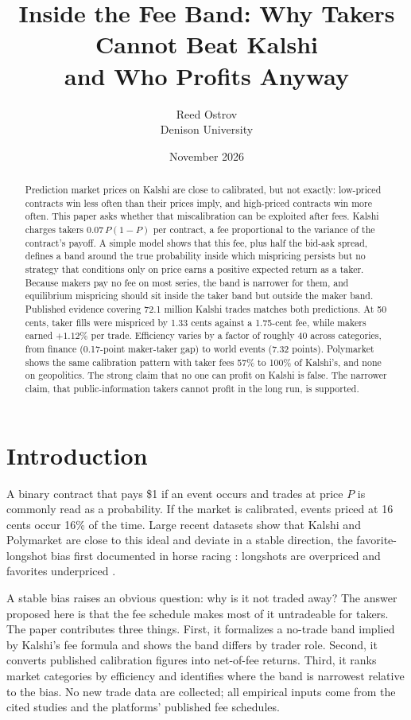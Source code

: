 \documentclass[11pt]{article}
\title{\textbf{Inside the Fee Band: Why Takers Cannot Beat Kalshi\\and Who Profits Anyway}}
\author{Reed Ostrov\\ \small Denison University}
\date{\small November 2026}
\begin{document}
\maketitle

\begin{abstract}
\noindent
Prediction market prices on Kalshi are close to calibrated, but not exactly: low-priced contracts win less often than their prices imply, and high-priced contracts win more often. This paper asks whether that miscalibration can be exploited after fees. Kalshi charges takers $0.07\,P(1-P)$ per contract, a fee proportional to the variance of the contract's payoff. A simple model shows that this fee, plus half the bid-ask spread, defines a band around the true probability inside which mispricing persists but no strategy that conditions only on price earns a positive expected return as a taker. Because makers pay no fee on most series, the band is narrower for them, and equilibrium mispricing should sit inside the taker band but outside the maker band. Published evidence covering 72.1 million Kalshi trades matches both predictions. At 50 cents, taker fills were mispriced by 1.33 cents against a 1.75-cent fee, while makers earned $+1.12\%$ per trade. Efficiency varies by a factor of roughly 40 across categories, from finance (0.17-point maker-taker gap) to world events (7.32 points). Polymarket shows the same calibration pattern with taker fees 57\% to 100\% of Kalshi's, and none on geopolitics. The strong claim that no one can profit on Kalshi is false. The narrower claim, that public-information takers cannot profit in the long run, is supported.
\end{abstract}

\section{Introduction}

A binary contract that pays \$1 if an event occurs and trades at price $P$ is commonly read as a probability. If the market is calibrated, events priced at 16 cents occur 16\% of the time. Large recent datasets show that Kalshi and Polymarket are close to this ideal and deviate in a stable direction, the favorite-longshot bias first documented in horse racing \citep{griffith1949,thaler1988}: longshots are overpriced and favorites underpriced \citep{becker2026,burgi2026,le2026}.

A stable bias raises an obvious question: why is it not traded away? The answer proposed here is that the fee schedule makes most of it untradeable for takers. The paper contributes three things. First, it formalizes a no-trade band implied by Kalshi's fee formula and shows the band differs by trader role. Second, it converts published calibration figures into net-of-fee returns. Third, it ranks market categories by efficiency and identifies where the band is narrowest relative to the bias. No new trade data are collected; all empirical inputs come from the cited studies and the platforms' published fee schedules.
\end{document}
